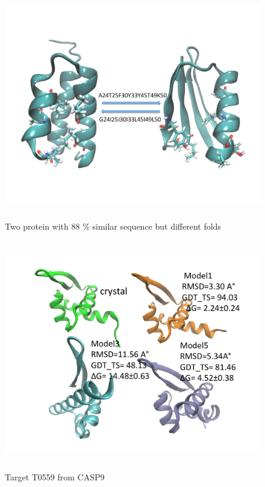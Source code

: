 \documentclass[12pt]{article}
\begin{document}
\begin{figure}
\begin{center}
\includegraphics[width=12cm,height=10cm]{G88.pdf}
\end{center}
\caption{Two protein with 88 \% similar sequence but different folds}
\label{fig:G88}
\end{figure}

\begin{figure}
\begin{center}
\includegraphics[width=12cm,height=10cm]{T0559.pdf}
\end{center}
\caption{Target T0559 from CASP9}
\label{fig:T0559}
\end{figure}
\end{document}
